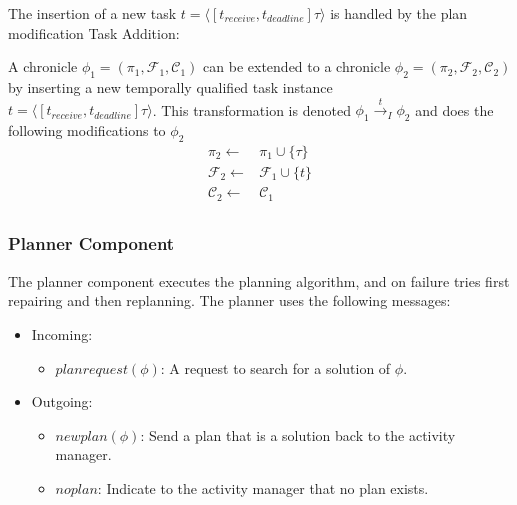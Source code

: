 The insertion of a new task $t = \langle[t_{receive},t_{deadline}] \tau\rangle$ is handled by the plan modification Task Addition:

\begin{definition}
    A chronicle $\phi_1 = (\pi_1,\mathcal{F}_1,\mathcal{C}_1)$ can be extended to a chronicle $\phi_2 = (\pi_2,\mathcal{F}_2,\mathcal{C}_2)$ by inserting a new temporally qualified task instance \\
    $t = \langle[t_{receive},t_{deadline}] \tau\rangle$.
    This transformation is denoted $\phi_1 \xrightarrow{t}_I \phi_2$ and does the following modifications to $\phi_2$
  \begin{align*}
    \pi_2 \leftarrow & \pi_1 \cup \{\tau\} \\
    \mathcal{F}_2 \leftarrow & \mathcal{F}_1 \cup \{t\} \\
    \mathcal{C}_2 \leftarrow & \mathcal{C}_1 \\
  \end{align*}
\end{definition}

\subsubsection{Planner Component}

The planner component executes the planning algorithm, and on failure tries first repairing and then replanning.
The planner uses the following messages:

\begin{itemize}
    \item Incoming:
    \begin{itemize}
        \item $planrequest(\phi)$: A request to search for a solution of $\phi$.
    \end{itemize}
    \item Outgoing:
    \begin{itemize}
        \item $newplan(\phi)$: Send a plan that is a solution back to the activity manager.
        \item $noplan$: Indicate to the activity manager that no plan exists.
    \end{itemize}
\end{itemize}

